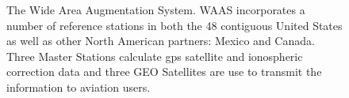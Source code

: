 

\begin{figure}
	\centering
	\caption{The Wide Area Augmentation System.  WAAS incorporates a number of reference stations in both the 48 contiguous United States as well as other North American partners: Mexico and Canada.  Three Master Stations calculate \ac{gps} satellite and ionospheric correction data and three GEO Satellites are use to transmit the information to aviation users.}
	\label{fig:WAAS-Overview-1}
\end{figure}

